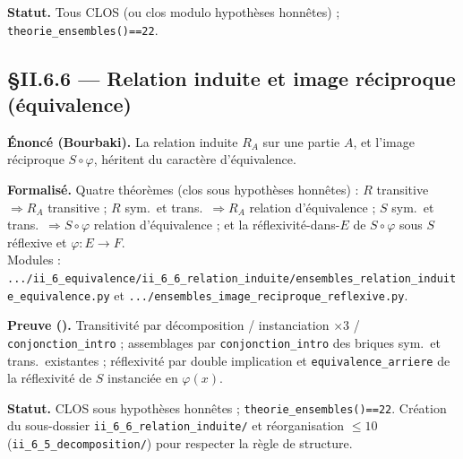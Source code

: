 \textbf{Statut.} Tous CLOS (ou clos modulo hypothèses honnêtes) ; \texttt{theorie\_ensembles()==22}.

\subsection{§II.6.6 --- Relation induite et image réciproque (équivalence)}
\textbf{Énoncé (Bourbaki).} La relation induite $R_A$ sur une partie $A$, et
l'image réciproque $S\circ\varphi$, héritent du caractère d'équivalence.

\textbf{Formalisé.} Quatre théorèmes (clos sous hypothèses honnêtes) :
$R$ transitive $\Rightarrow R_A$ transitive ; $R$ sym.\ et trans.\ $\Rightarrow R_A$
relation d'équivalence ; $S$ sym.\ et trans.\ $\Rightarrow S\circ\varphi$ relation
d'équivalence ; et la réflexivité-dans-$E$ de $S\circ\varphi$ sous
$S$ réflexive et $\varphi:E\to F$. \\
Modules : \texttt{.../ii\_6\_equivalence/ii\_6\_6\_relation\_induite/ensembles\_relation\_induite\_equivalence.py}
et \texttt{.../ensembles\_image\_reciproque\_reflexive.py}.

\textbf{Preuve (\Nstar).} Transitivité par décomposition / instanciation ×3 /
\texttt{conjonction\_intro} ; assemblages par \texttt{conjonction\_intro} des
briques sym.\ et trans.\ existantes ; réflexivité par double implication et
\texttt{equivalence\_arriere} de la réflexivité de $S$ instanciée en $\varphi(x)$.

\textbf{Statut.} CLOS sous hypothèses honnêtes ; \texttt{theorie\_ensembles()==22}.
Création du sous-dossier \texttt{ii\_6\_6\_relation\_induite/} et réorganisation
$\leq 10$ (\texttt{ii\_6\_5\_decomposition/}) pour respecter la règle de structure.
